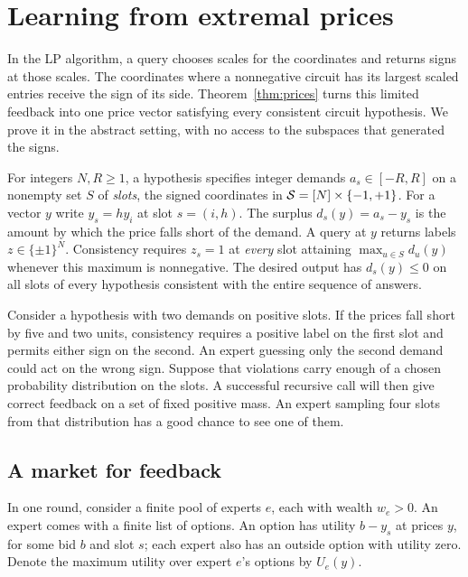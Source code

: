 \section{Learning from extremal prices}\label{sec:prices}

In the LP algorithm, a query chooses scales for the coordinates and returns
signs at those scales. The coordinates where a nonnegative circuit has its largest
scaled entries receive the sign of its side. Theorem~\ref{thm:prices} turns this limited
feedback into one price vector satisfying every consistent circuit
hypothesis. We prove it in the abstract setting, with no access to the
subspaces that generated the signs.

For integers \(N,R\ge1\), a hypothesis specifies integer demands
\(a_s\in[-R,R]\) on a nonempty set \(S\) of \emph{slots}, the signed
coordinates in \(\mathcal S=[N]\times\{-1,+1\}\). For a vector \(y\)
write \(y_s=h y_i\) at slot \(s=(i,h)\). The surplus
\(d_s(y)=a_s-y_s\) is the amount by which the price falls short of
the demand. A query at \(y\) returns labels \(z\in\{\pm1\}^N\).
Consistency requires \(z_s=1\) at \emph{every} slot attaining
\(\max_{u\in S}d_u(y)\) whenever this maximum is nonnegative.
The desired output has \(d_s(y)\le0\) on all slots of every hypothesis
consistent with the entire sequence of answers.

Consider a hypothesis with two demands on positive slots. If the prices
fall short by five and two units, consistency requires a positive label
on the first slot and permits either sign on the second. An expert
guessing only the second demand could act on the wrong sign. Suppose
that violations carry enough of a chosen probability distribution on
the slots. A successful recursive call will then give correct feedback
on a set of fixed positive mass. An expert sampling four slots from
that distribution has a good chance to see one of them.

\subsection{A market for feedback}

In one round, consider a finite pool of experts \(e\),
each with wealth \(w_e>0\).
An expert comes with a finite list of options. An option has utility
\(b-y_s\) at prices \(y\), for some bid \(b\) and slot \(s\);
each expert also has an outside option with utility zero.
Denote the maximum utility over expert \(e\)'s options by \(U_e(y)\).

